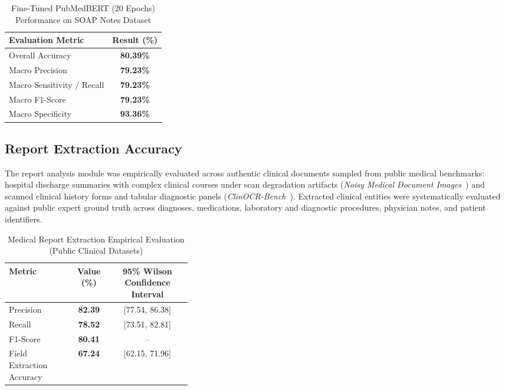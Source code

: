 \documentclass[conference]{IEEEtran}
\begin{document}
\begin{table}[htbp]
\centering
\caption{Fine-Tuned PubMedBERT (20 Epochs) Performance on SOAP Notes Dataset}
\label{tab:pubmedbert_soap_evaluation}
\footnotesize
\renewcommand{\arraystretch}{1.15}
\begin{tabularx}{\linewidth}{|L|C|}
\hline
\textbf{Evaluation Metric} & \textbf{Result (\%)} \\
\hline
Overall Accuracy & \textbf{80.39\%} \\
Macro Precision & \textbf{79.23\%} \\
Macro Sensitivity / Recall & \textbf{79.23\%} \\
Macro F1-Score & \textbf{79.23\%} \\
Macro Specificity & \textbf{93.36\%} \\
\hline
\end{tabularx}
\end{table}

\subsection{Report Extraction Accuracy}

The report analysis module was empirically evaluated across authentic clinical documents sampled from public medical benchmarks: hospital discharge summaries with complex clinical courses under scan degradation artifacts (\textit{Noisy Medical Document Images}~\cite{noisy_med_docs}) and scanned clinical history forms and tabular diagnostic panels (\textit{ClinOCR-Bench}~\cite{clinocr_bench}). Extracted clinical entities were systematically evaluated against public expert ground truth across diagnoses, medications, laboratory and diagnostic procedures, physician notes, and patient identifiers.

\begin{table}[ht]
\centering
\caption{Medical Report Extraction Empirical Evaluation (Public Clinical Datasets)}
\label{tab:report_results}
\footnotesize
\renewcommand{\arraystretch}{1.15}
\begin{tabularx}{\linewidth}{|>{\raggedright\arraybackslash}p{0.36\linewidth}|C|C|}
\hline
\textbf{Metric} & \textbf{Value (\%)} & \textbf{95\% Wilson Confidence Interval} \\
\hline
Precision & \textbf{82.39} & [77.54, 86.38] \\
Recall & \textbf{78.52} & [73.51, 82.81] \\
F1-Score & \textbf{80.41} & -- \\
Field Extraction Accuracy & \textbf{67.24} & [62.15, 71.96] \\
\hline
\end{tabularx}
\end{table}
\end{document}
